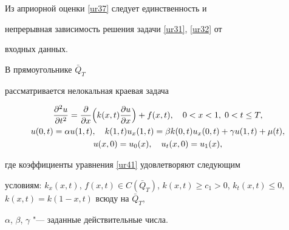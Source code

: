 \smallskip



 Из априорной оценки \eqref{ur37} следует единственность и

непрерывная зависимость решения задачи \eqref{ur31}, \eqref{ur32} от

входных данных.



 В прямоугольнике $\bar Q_T$

рассматривается нелокальная краевая задача

\begin{gather}

\frac{\partial^2 u}{\partial t^2}=\frac{\partial}{\partial

x}\Bigl(k(x,t)\frac{\partial u}{\partial x}\Bigr)+f(x,t), \quad 0<x<1, \; 0<t\leq T, \label{ur41}

\\

u(0, t)=\alpha u(1,t),\quad k(1,t)u_x(1,t)=\beta

k(0,t)u_x(0,t)+\gamma u(1,t)+\mu(t),\label{ur42}

\\

 u(x,0)=u_0(x),\quad

u_t(x,0)=u_1(x), \label{ur43}

\end{gather}

где коэффициенты уравнения \eqref{ur41} удовлетворяют следующим

условиям: \linebreak $k_x(x,t)$,  $f(x,t)\in C{(\bar Q_T)}$, $ k(x,t)\geq

c_1>0$, $k_t(x,t)\leq 0$, $k(x,t)=k(1-x,t)$ всюду на $\bar Q_T$,

$\alpha$, $\beta$, $\gamma$ "--- заданные действительные числа.



